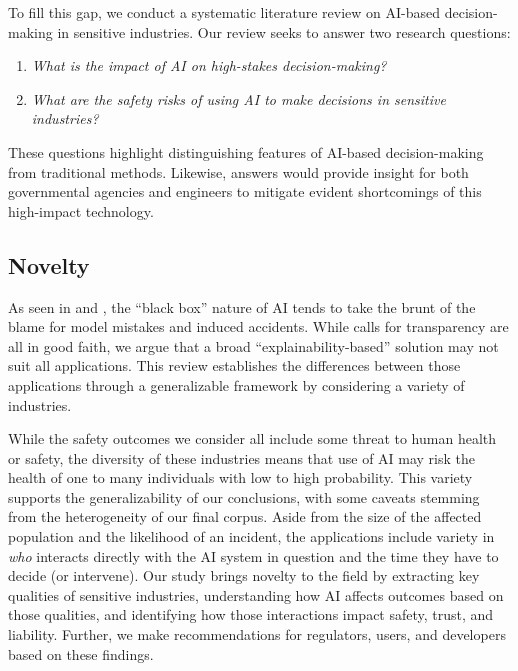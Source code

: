 \documentclass[authoryear,preprint,12pt]{elsarticle}
\begin{document}
To fill this gap, we conduct a systematic literature review on AI-based
decision-making in sensitive industries. Our review seeks to answer two research questions:
\begin{enumerate}
    \item \textit{What is the impact of AI on high-stakes decision-making?}
    \item \textit{What are the safety risks of using AI to make decisions in
    sensitive industries?}
    \end{enumerate} 

These questions highlight distinguishing features of AI-based decision-making
from traditional methods. Likewise, answers would provide insight for both
governmental agencies and engineers to mitigate evident shortcomings of this
high-impact technology.

\subsection{Novelty}
As seen in
\cite{wangArtificialIntelligenceSafetycritical2021} and
\cite{bachUnpackingHumanAIInteraction2024}, the ``black box'' nature of AI tends
to take the brunt of the blame for model mistakes and induced accidents. While
calls for transparency are all in good faith, we argue that a broad
``explainability-based'' solution may not suit all applications. This review
establishes the differences between those applications through a generalizable
framework by considering a variety of industries. 

While the safety outcomes we consider all include some threat to human health or
safety, the diversity of these industries means that use of AI may risk the
health of one to many individuals with low to high probability. This variety
supports the generalizability of our conclusions, with some caveats stemming
from the heterogeneity of our final corpus. Aside from the size of the affected
population and the likelihood of an incident, the applications include variety
in \textit{who} interacts directly with the AI system in question and the time
they have to decide (or intervene). Our study brings novelty to the field by
extracting key qualities of sensitive industries, understanding how AI affects
outcomes based on those qualities, and identifying how those interactions impact
safety, trust, and liability. Further, we make recommendations for regulators,
users, and developers based on these findings.  
\end{document}
